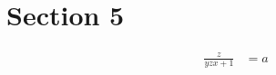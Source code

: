 \documentclass[11pt]{article}
\begin{document}
\section{Section 5}
\begin{enumerate}
		\begin{align}
			\label{1}
			\frac{z}{yzx+1} &= a\\
		\end{align}
	\end{enumerate}
\end{document}
